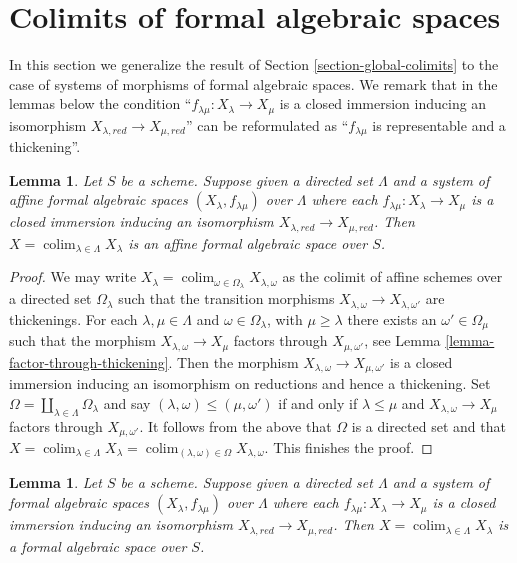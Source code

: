 \documentclass{stacks-project}
\theoremstyle{plain}
\newtheorem{lemma}[subsection]{Lemma}
\theoremstyle{definition}
\theoremstyle{remark}
\numberwithin{equation}{subsection}
\def\colim{\mathop{\mathrm{colim}}\nolimits}
\begin{document}
\section{Colimits of formal algebraic spaces}
\label{section-colimits-of-formal}

\noindent
In this section we generalize the result of
Section \ref{section-global-colimits}
to the case of systems of morphisms of formal algebraic spaces.
We remark that in the lemmas below the condition
``$f_{\lambda \mu} : X_\lambda \to X_\mu$ is a closed immersion
inducing an isomorphism $X_{\lambda, red} \to X_{\mu, red}$''
can be reformulated as
``$f_{\lambda \mu}$ is representable and a thickening''.

\begin{lemma}
\label{lemma-colimit-affine-formal}
Let $S$ be a scheme. Suppose given a directed set
$\Lambda$ and a system of affine formal algebraic spaces
$(X_\lambda, f_{\lambda \mu})$ over $\Lambda$ where each
$f_{\lambda \mu} : X_\lambda \to X_\mu$ is a closed immersion
inducing an isomorphism $X_{\lambda, red} \to X_{\mu, red}$.
Then $X = \colim_{\lambda \in \Lambda} X_\lambda$
is an affine formal algebraic space over $S$.
\end{lemma}

\begin{proof}
We may write
$X_\lambda = \colim_{\omega \in \Omega_\lambda} X_{\lambda, \omega}$
as the colimit of affine schemes over a directed set
$\Omega_\lambda$ such that the transition morphisms
$X_{\lambda, \omega} \to X_{\lambda, \omega'}$
are thickenings. For each $\lambda, \mu \in \Lambda$
and $\omega \in \Omega_\lambda$, with $\mu \geq \lambda$
there exists an $\omega' \in \Omega_\mu$ such that the morphism
$X_{\lambda, \omega} \to X_\mu$ factors through $X_{\mu, \omega'}$, see
Lemma \ref{lemma-factor-through-thickening}. Then
the morphism $X_{\lambda, \omega} \to X_{\mu, \omega'}$
is a closed immersion inducing an isomorphism on reductions
and hence a thickening. Set
$\Omega = \coprod_{\lambda \in \Lambda} \Omega_\lambda$
and say $(\lambda, \omega) \leq (\mu, \omega')$ if and only if
$\lambda \leq \mu$ and $X_{\lambda, \omega} \to X_\mu$ factors through
$X_{\mu, \omega'}$. It follows from the above that
$\Omega$ is a directed set and that
$X = \colim_{\lambda \in \Lambda} X_\lambda =
\colim_{(\lambda, \omega) \in \Omega} X_{\lambda, \omega}$.
This finishes the proof.
\end{proof}

\begin{lemma}
\label{lemma-colimit-formal-spaces-is-formal-space}
Let $S$ be a scheme. Suppose given a directed set
$\Lambda$ and a system of formal algebraic spaces
$(X_\lambda, f_{\lambda \mu})$ over $\Lambda$ where each
$f_{\lambda \mu} : X_\lambda \to X_\mu$ is a closed immersion
inducing an isomorphism $X_{\lambda, red} \to X_{\mu, red}$.
Then $X = \colim_{\lambda \in \Lambda} X_\lambda$
is a formal algebraic space over $S$.
\end{lemma}
\end{document}
